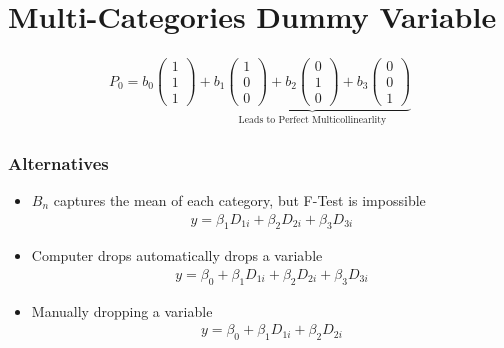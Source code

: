 \documentclass[../main.tex]{subfile}
\begin{document}
    \section{Multi-Categories Dummy Variable}
    \begin{align}
        P_0 = b_0 \begin{pmatrix} 1 \\ 1 \\ 1\end{pmatrix} + \underbrace{b_1 \begin{pmatrix} 1 \\ 0 \\ 0\end{pmatrix} + b_2 \begin{pmatrix} 0 \\ 1 \\ 0\end{pmatrix} +b_3 \begin{pmatrix} 0 \\ 0 \\ 1\end{pmatrix}}_{\text{Leads to Perfect Multicollinearlity}}
    \end{align}
    \subsubsection{Alternatives}
    \begin{itemize}
        \item $B_n$ captures the mean of each category, but F-Test is impossible\begin{align} y = \beta_1 D_{1i} + \beta_2 D_{2i} + \beta_3 D_{3i}\end{align}
        \item Computer drops automatically drops a variable \begin{align} y = \beta_0 + \beta_1 D_{1i} + \beta_2 D_{2i} + \beta_3 D_{3i} \end{align}
        \item Manually dropping a variable \begin{align} y = \beta_0 + \beta_1 D_{1i} + \beta_2 D_{2i} \end{align}
    \end{itemize}
\end{document}
